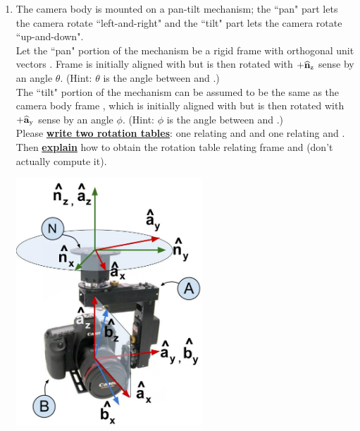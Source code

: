 \documentclass[11pt,letterpaper]{book}
\begin{document}
\begin{enumerate}
\begin{enumerate}
\clearpage
\item
\begin{minipage}[t]{0.53\columnwidth}
The camera body is mounted on a pan-tilt mechanism; the ``pan" part lets the camera rotate ``left-and-right" and the ``tilt" part lets the camera rotate ``up-and-down".
\\[1.0pc]
Let the ``pan" portion of the mechanism be a rigid frame  with orthogonal unit vectors . Frame  is initially aligned with  but is then rotated with $+\mathbf{\widehat{n}}_{\mathrm{z}}{}$ sense by an angle $\theta$. (Hint: $\theta$ is the angle between  and .)
\\[1.0pc]
The ``tilt" portion of the mechanism can be assumed to be the same as the camera body frame , which is initially aligned with  but is then rotated with $+\mathbf{\widehat{a}}_{\mathrm{y}}{}$ sense by an angle $\phi$. (Hint: $\phi$ is the angle between  and .)
\\[1.0pc]
Please \textbf{\underline{write two rotation tables}}: one relating  and  and one relating  and .
\\[0.25pc]
Then \textbf{\underline{explain}} how to obtain the rotation table relating frame  and  (don't actually compute it).
\end{minipage}
\hfill
\begin{minipage}[t]{0.37\columnwidth}
\flushright
\vspace*{0pt}
\includegraphics[width=7cm]{camera_pan_tilt.jpg}
\end{minipage}


\end{enumerate}
\end{enumerate}
\end{document}
